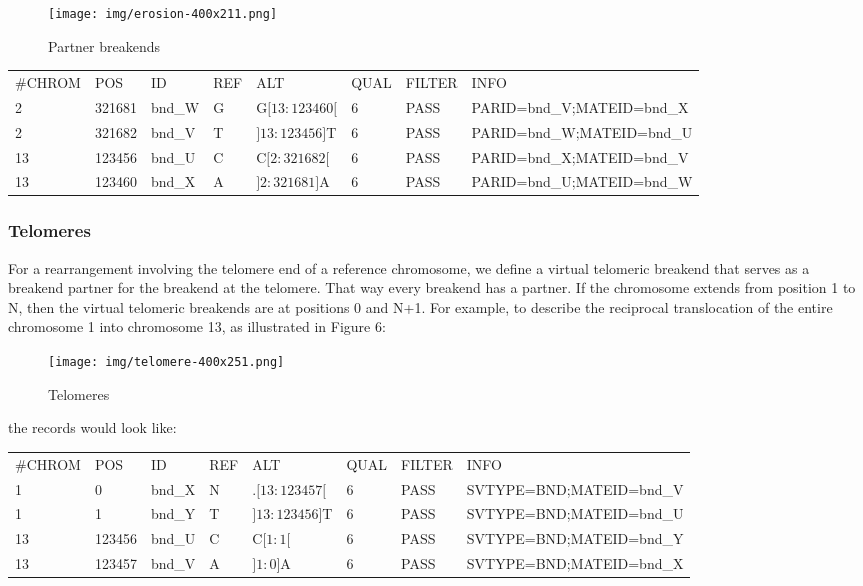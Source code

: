 \documentclass[8pt]{article}
\begin{document}
\begin{figure}[ht]
\centering
\texttt{[image: img/erosion-400x211.png]}
\caption{Partner breakends}
\end{figure}

\vspace{0.3cm}
\small
\begin{tabular}{ l l l l l l l l }
\#CHROM & POS & ID & REF & ALT & QUAL & FILTER & INFO \\
2 & 321681 & bnd\_W & G & G$[13:123460[$ & 6 & PASS & PARID=bnd\_V;MATEID=bnd\_X \\
2 & 321682 & bnd\_V & T & $]13:123456]$T & 6 & PASS & PARID=bnd\_W;MATEID=bnd\_U \\
13 & 123456 & bnd\_U & C & C$[2:321682[$ & 6 & PASS &  PARID=bnd\_X;MATEID=bnd\_V \\
13 & 123460 & bnd\_X & A & $]2:321681]$A & 6 & PASS &  PARID=bnd\_U;MATEID=bnd\_W \\
\end{tabular}
\normalsize

\subsubsection{Telomeres}
For a rearrangement involving the telomere end of a reference chromosome, we define a virtual telomeric breakend that serves as a breakend partner for the breakend at the telomere.
That way every breakend has a partner.
If the chromosome extends from position 1 to N, then the virtual telomeric breakends are at positions 0 and N+1.
For example, to describe the reciprocal translocation of the entire chromosome 1 into chromosome 13, as illustrated in Figure 6:

\begin{figure}[h]
\centering
\texttt{[image: img/telomere-400x251.png]}
\caption{Telomeres}
\end{figure}

the records would look like:

\small
\begin{tabular}{ l l l l l l l l }
\#CHROM & POS & ID & REF & ALT & QUAL & FILTER & INFO \\
1 & 0 & bnd\_X & N & $.[13:123457[$ & 6 & PASS & SVTYPE=BND;MATEID=bnd\_V \\
1 & 1 & bnd\_Y & T & $]13:123456]$T & 6 & PASS & SVTYPE=BND;MATEID=bnd\_U \\
13 & 123456 & bnd\_U & C & C$[1:1[$ & 6 & PASS & SVTYPE=BND;MATEID=bnd\_Y \\
13 & 123457 & bnd\_V & A & $]1:0]$A & 6 & PASS & SVTYPE=BND;MATEID=bnd\_X \\
\end{tabular}
\normalsize
\end{document}
